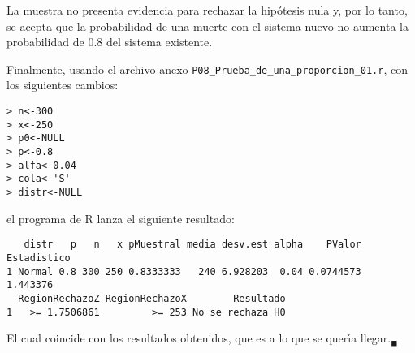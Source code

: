 \begin{solucion}
 \begin{conclusion}
  La muestra no presenta evidencia para rechazar la hip\'otesis nula
  y, por lo tanto, se acepta que la probabilidad de una muerte con el sistema nuevo
  no aumenta la probabilidad de $0.8$ del sistema existente.
 \end{conclusion}
 Finalmente, usando el archivo anexo \texttt{P08\_Prueba\_de\_una\_proporcion\_01.r},
 con los siguientes cambios:
 \begin{verbatim}
> n<-300
> x<-250
> p0<-NULL
> p<-0.8
> alfa<-0.04
> cola<-'S'
> distr<-NULL
 \end{verbatim}
 \vspace{-0.5cm}
 el programa de R lanza el siguiente resultado:
 \begin{verbatim}
   distr   p   n   x pMuestral media desv.est alpha    PValor Estadistico
1 Normal 0.8 300 250 0.8333333   240 6.928203  0.04 0.0744573    1.443376
  RegionRechazoZ RegionRechazoX        Resultado
1   >= 1.7506861         >= 253 No se rechaza H0
 \end{verbatim}
 \vspace{-0.5cm}
 El cual coincide con los resultados obtenidos,
 que es a lo que se quer\'{\i}a llegar.${}_{\blacksquare}$
\end{solucion}
